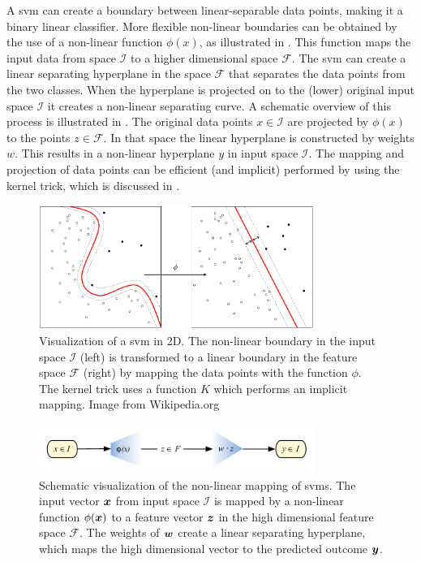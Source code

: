 A \gls{svm} can create a boundary between linear-separable data points, making it a binary linear classifier.
More flexible non-linear boundaries can be obtained by the use of a non-linear function $\phi(x)$, as illustrated in .
This function maps the input data from space $\mathcal{I}$ to a higher dimensional space $\mathcal{F}$.
The \gls{svm} can create a linear separating hyperplane in the space $\mathcal{F}$ that separates the data points from the two classes.
When the hyperplane is projected on to the (lower) original input space $\mathcal{I}$ it creates a non-linear separating curve.
A schematic overview of this process is illustrated in .
The original data points $x \in \mathcal{I}$ are projected by $\phi(x)$ to the points $z \in \mathcal{F}$.
In that space the linear hyperplane is constructed by weights $w$.
This results in a non-linear hyperplane $y$ in input space $\mathcal{I}$.
The mapping and projection of data points can be efficient (and implicit) performed by using the kernel trick, which is discussed in .

\begin{figure}
\centering
  \includegraphics[width=0.8\textwidth]{./Figures/chapter3/svm_kernel_mapping.png}
  \caption[Kernel mapping]{Visualization of a \gls{svm} in 2D.
  The non-linear boundary in the input space $\mathcal{I}$ (left) is transformed to a linear boundary in the feature space $\mathcal{F}$ (right) by mapping the data points with the function $\phi$.
  The kernel trick uses a function $K$ which performs an implicit mapping. Image from Wikipedia.org}
  \label{fig:kernel_mapping}
\end{figure}

\begin{figure}
\centering
  \includegraphics[width=0.8\textwidth]{./Figures/chapter3/svm_mapping_spaces.pdf}
  \caption[Mapping spaces in \gls{svm}]{Schematic visualization of the non-linear mapping of \glspl{svm}.
  The input vector $\vectorsym{x}$ from input space $\mathcal{I}$ is mapped by a non-linear function $\phi(\vectorsym{x})$ to a feature vector $\vectorsym{z}$ in the high dimensional feature space $\mathcal{F}$.
  The weights of $\vectorsym{w}$ create a linear separating hyperplane, which maps the high dimensional vector to the predicted outcome $\vectorsym{y}$.}
  \label{fig:svm_mapping_spaces}
\end{figure}

